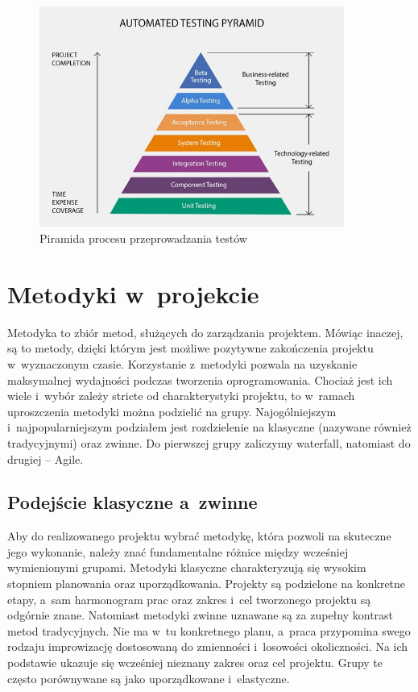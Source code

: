 \documentclass[oneside,polski,logo]{amuthesis}
\begin{document}
\begin{figure}[hb!]
	\centering
	\includegraphics[width=10cm]{images/hyps/test-diagram.jpg}
	\caption{Piramida procesu przeprowadzania testów}
\end{figure}

\section {Metodyki w~projekcie}
Metodyka to zbiór metod, służących do zarządzania projektem. Mówiąc inaczej, są to metody, dzięki którym jest możliwe pozytywne zakończenia projektu w~wyznaczonym czasie. Korzystanie z~metodyki pozwala na uzyskanie maksymalnej wydajności podczas tworzenia oprogramowania. Chociaż jest ich wiele i~wybór zależy stricte od charakterystyki projektu, to w~ramach uproszczenia metodyki można podzielić na grupy. Najogólniejszym i~najpopularniejszym podziałem jest rozdzielenie na klasyczne (nazywane również tradycyjnymi) oraz zwinne. Do pierwszej grupy zaliczymy waterfall, natomiast do drugiej – Agile.

\subsection {Podejście klasyczne a~zwinne}
Aby do realizowanego projektu wybrać metodykę, która pozwoli na skuteczne jego wykonanie, należy znać fundamentalne różnice między wcześniej wymienionymi grupami. Metodyki klasyczne charakteryzują się wysokim stopniem planowania oraz uporządkowania. Projekty są podzielone na konkretne etapy, a~sam harmonogram prac oraz zakres i~cel tworzonego projektu są odgórnie znane. Natomiast metodyki zwinne uznawane są za zupełny kontrast metod tradycyjnych. Nie ma w~tu konkretnego planu, a~praca przypomina swego rodzaju improwizację dostosowaną do zmienności i~losowości okoliczności. Na ich podstawie ukazuje się wcześniej nieznany zakres oraz cel projektu. Grupy te często porównywane są jako uporządkowane i~elastyczne.
\end{document}
